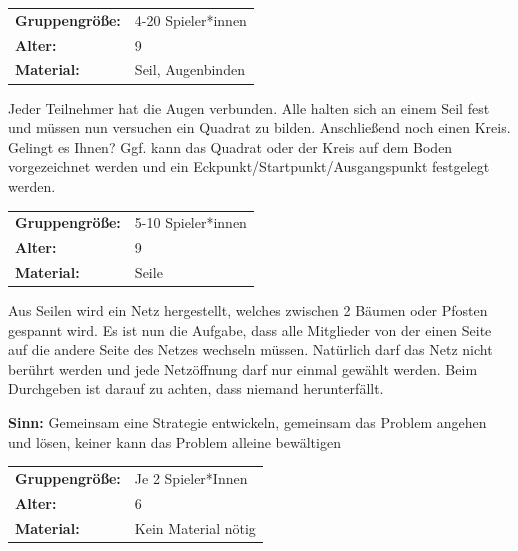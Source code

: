 \newpage
\begin{table}[H]
\begin{tabular}{>{\bfseries}lp{8cm}}
   Gruppengröße:   & 4-20 Spieler*innen\\
    Alter: & 9 \\
    Material: &  Seil, Augenbinden\\ 
\end{tabular}
\end{table} 
Jeder Teilnehmer hat die Augen verbunden. Alle halten sich an einem Seil fest und müssen nun versuchen ein Quadrat zu bilden. Anschließend noch einen Kreis. Gelingt es Ihnen? Ggf. kann das Quadrat oder der Kreis auf dem Boden vorgezeichnet werden und ein Eckpunkt/Startpunkt/Ausgangspunkt festgelegt werden.

\begin{table}[H]
\begin{tabular}{>{\bfseries}lp{8cm}}
   Gruppengröße:   & 5-10 Spieler*innen\\
    Alter: & 9 \\
    Material: & Seile \\ 
\end{tabular}
\end{table} 

Aus Seilen wird ein Netz hergestellt, welches zwischen 2 Bäumen oder Pfosten gespannt wird. Es ist nun die Aufgabe, dass alle Mitglieder von der einen Seite auf die andere Seite des Netzes wechseln müssen. Natürlich darf das Netz nicht berührt werden und jede Netzöffnung darf nur einmal gewählt werden. Beim Durchgeben ist darauf zu achten, dass niemand herunterfällt.

\textbf{Sinn:} Gemeinsam eine Strategie entwickeln, gemeinsam das Problem angehen und lösen, keiner kann das Problem alleine bewältigen

\begin{table}[H]
\begin{tabular}{>{\bfseries}lp{8cm}}
   Gruppengröße:   & Je 2 Spieler*Innen\\
    Alter: & 6 \\
    Material: & Kein Material nötig \\ 
\end{tabular}
\end{table} 

